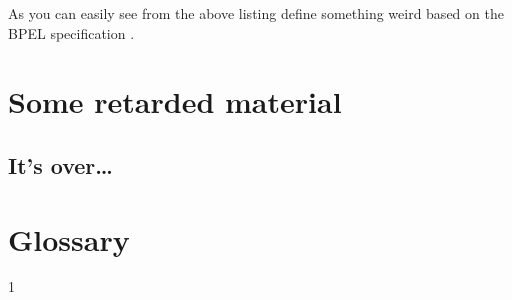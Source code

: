 \documentclass[mscthesis]{usiinfthesis}
\begin{document}
As you can easily see from the above listing \citet{bbggs:iet07}
define something weird based on the BPEL specification
\citep{bpelspec}.
\nocite{*}

\appendix %

\chapter{Some retarded material}
\section{It's over\dots}

\backmatter

\chapter{Glossary} %

%
%



1
\end{document}
